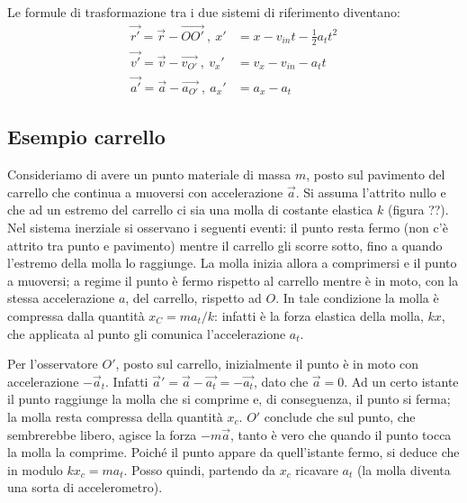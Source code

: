 \documentclass[class=book, crop=false, oneside, 12pt]{standalone}
\begin{document}
Le formule di trasformazione tra i due sistemi di riferimento diventano:
\begin{align*}
    \overrightarrow{r'} = \overrightarrow{r} - \overrightarrow{OO'} \ , \ x' & = x - v_{in} t - \frac{1}{2} a_t t^2 \\
    \overrightarrow{v'} = \overrightarrow{v} - \overrightarrow{v_{O'}} \ , \ v_x' & = v_x -v_{in} - a_t t \\
    \overrightarrow{a'} = \overrightarrow{a} - \overrightarrow{a_{O'}} \ , \ a_x' & = a_x - a_t 
\end{align*}


\subsection{Esempio carrello}
Consideriamo di avere un punto materiale di massa \(m\), posto sul pavimento del carrello che continua a muoversi con accelerazione \(\overrightarrow{a}\). 
Si assuma l'attrito nullo e che ad un estremo del carrello ci sia una molla di costante elastica \(k\) (figura ??). %
Nel sistema inerziale si osservano i seguenti eventi: il punto resta fermo (non c'è attrito tra punto e pavimento) mentre il carrello gli scorre sotto, fino a quando l'estremo della molla lo raggiunge. 
La molla inizia allora a comprimersi e il punto a muoversi; a regime il punto è fermo rispetto al carrello mentre è in moto, con la stessa accelerazione \(a\), del carrello, rispetto ad \(O\). 
In tale condizione la molla è compressa dalla quantità \(x_C = m a_t / k\): infatti è la forza elastica della molla, \(k x\), che applicata al punto gli comunica l'accelerazione \(a_t\).

Per l'osservatore \(O'\), posto sul carrello, inizialmente il punto è in moto con accelerazione \(-\overrightarrow{a}_{t}\). 
Infatti \(\overrightarrow{a}' = \overrightarrow{a} -\overrightarrow{a_t}= -\overrightarrow{a_t} \), dato che \(\overrightarrow{a} = 0\). 
Ad un certo istante il punto raggiunge la molla che si comprime e, di conseguenza, il punto si ferma; la molla resta compressa della quantità \(x_c\). 
\(O'\) conclude che sul punto, che sembrerebbe libero, agisce la forza \(-m \overrightarrow{a}\), tanto è vero che quando il punto tocca la molla la comprime. 
Poiché il punto appare da quell'istante fermo, si deduce che in modulo \(k x_c = m a_t\). 
Posso quindi, partendo da \(x_c\) ricavare \(a_t\) (la molla diventa una sorta di accelerometro).
\end{document}
